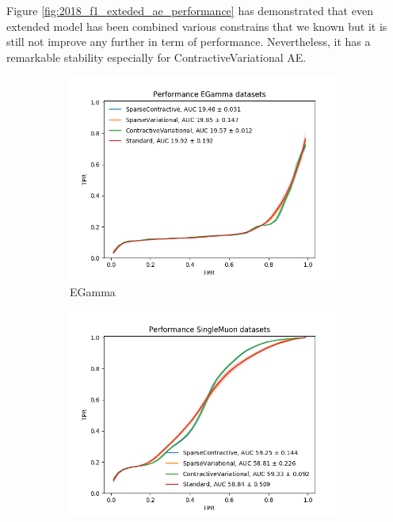 Figure \ref{fig:2018_f1_exteded_ae_performance} has demonstrated that even extended model has been combined various constrains that we known but it is still not improve any further in term of performance. Nevertheless, it has a remarkable stability especially for ContractiveVariational AE.

\begin{figure}[h!]
\centering
    \begin{subfigure}[b]{0.49\linewidth}
        \includegraphics[width=\linewidth]{images/reco/2018/feature_1/performance_EGamma_SparseContractiveSparseVariationalContractiveVariationalStandard.png}
        \caption{EGamma}
    \end{subfigure}
    \begin{subfigure}[b]{0.49\linewidth}
        \includegraphics[width=\linewidth]{images/reco/2018/feature_1/performance_SingleMuon_SparseContractiveSparseVariationalContractiveVariationalStandard.png}

\end{subfigure}
\end{figure}
